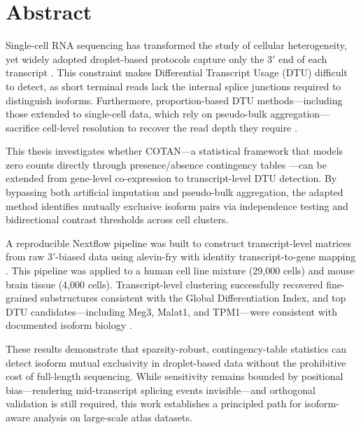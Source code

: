 \chapter*{Abstract}

Single-cell RNA sequencing has transformed the study of cellular heterogeneity, yet widely adopted droplet-based protocols capture only the $3'$ end of each transcript \cite{conte2024opportunities}. This constraint makes Differential Transcript Usage (DTU) difficult to detect, as short terminal reads lack the internal splice junctions required to distinguish isoforms. Furthermore, proportion-based DTU methods---including those extended to single-cell data, which rely on pseudo-bulk aggregation---sacrifice cell-level resolution to recover the read depth they require \cite{gilis2021satuRn, patrick2020sierra}.

This thesis investigates whether COTAN---a statistical framework that models zero counts directly through presence/absence contingency tables \cite{galfre2021cotan}---can be extended from gene-level co-expression to transcript-level DTU detection. By bypassing both artificial imputation and pseudo-bulk aggregation, the adapted method identifies mutually exclusive isoform pairs via independence testing and bidirectional contrast thresholds across cell clusters.

A reproducible Nextflow pipeline was built to construct transcript-level matrices from raw $3'$-biased data using alevin-fry with identity transcript-to-gene mapping \cite{he2022alevin}. This pipeline was applied to a human cell line mixture (29{,}000 cells) and mouse brain tissue (4{,}000 cells). Transcript-level clustering successfully recovered fine-grained substructures consistent with the Global Differentiation Index, and top DTU candidates---including Meg3, Malat1, and TPM1---were consistent with documented isoform biology \cite{joglekar2023words}.

These results demonstrate that sparsity-robust, contingency-table statistics can detect isoform mutual exclusivity in droplet-based data without the prohibitive cost of full-length sequencing. While sensitivity remains bounded by positional bias---rendering mid-transcript splicing events invisible---and orthogonal validation is still required, this work establishes a principled path for isoform-aware analysis on large-scale atlas datasets.
